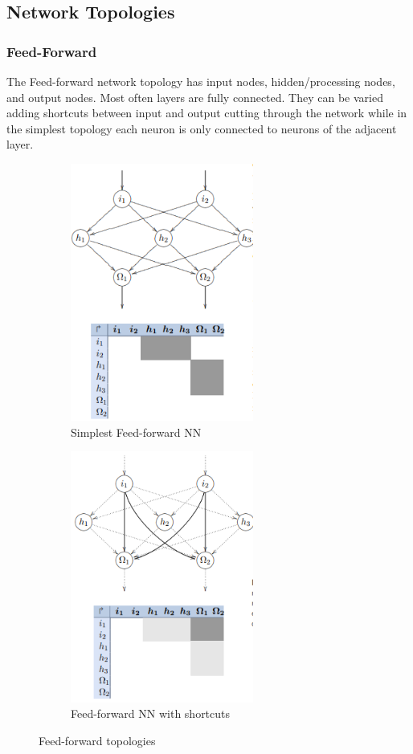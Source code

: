 \subsection{Network Topologies}
\subsubsection{Feed-Forward}
The Feed-forward network topology has input nodes, hidden/processing nodes, and output nodes. Most often layers are fully connected. They can be varied adding shortcuts between input and output cutting through the network while in the simplest topology each neuron is only connected to neurons of the adjacent layer.
\begin{figure}[htbp]
    \hspace*{-2cm}
    \centering
    \begin{subfigure}{8cm}
      \centering
      \includegraphics[width=6cm]{Learning Paradigms/simplest_ffnn.png}
      \caption{Simplest Feed-forward NN}
      \label{fig:sub1}
    \end{subfigure}%
    \begin{subfigure}{8cm}
      \centering
      \includegraphics[width =6cm]{Learning Paradigms/shortcut_ffnn.png}
      \caption{Feed-forward NN with shortcuts}
      \label{fig:sub2}
    \end{subfigure}
    \caption{Feed-forward topologies}
    \label{fig:feedforward}
    \end{figure}
